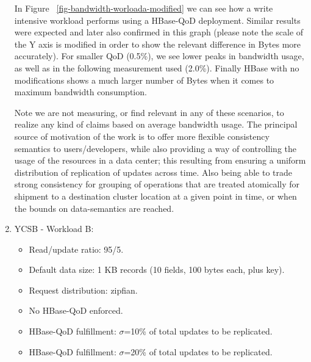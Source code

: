 \begin{enumerate}
In Figure ~\ref{fig-bandwidth-worloada-modified} we can see how a write intensive workload performs using a HBase-QoD deployment. Similar results were expected and later also confirmed in this graph (please note the scale of the Y axis is modified in order to show the relevant difference in Bytes more accurately).
  For smaller QoD (0.5\%), we see lower peaks in bandwidth usage, as well as in the following measurement used (2.0\%). Finally HBase with no modifications shows a much larger number of Bytes when it comes to maximum bandwidth consumption.

Note we are not measuring, or find relevant in any of these scenarios, to realize any kind of claims based on average bandwidth usage. The principal source of motivation of the work is to offer more flexible consistency semantics to users/developers, while also providing a way of controlling the usage of the resources in a data center; this resulting from  ensuring a uniform distribution of replication of updates across time. Also being able to trade strong consistency for grouping of operations that are treated atomically for shipment to a destination cluster location at a given point in time, or when the bounds on data-semantics are reached.


\item{YCSB - Workload B:}
\begin{itemize}
	\item Read/update ratio: 95/5.
	\item Default data size: 1 KB records (10 fields, 100 bytes each, plus key).
	\item Request distribution: zipfian.
	\item No HBase-QoD enforced.
	\item HBase-QoD fulfillment: $\sigma$=10\% of total updates to be replicated.
	\item HBase-QoD fulfillment: $\sigma$=20\% of total updates to be replicated.
\end{itemize}
	

\end{enumerate}
